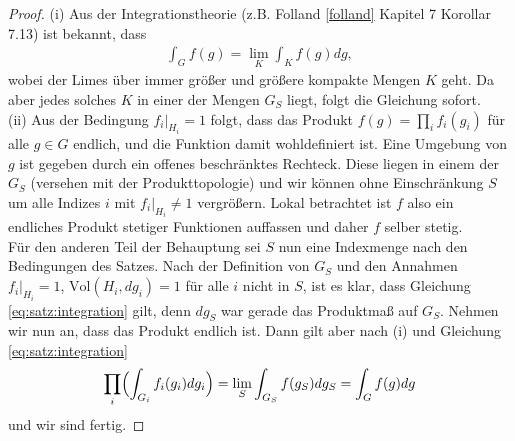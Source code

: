 		\begin{proof}
			(i) Aus der Integrationstheorie (z.B. Folland \ref{folland} Kapitel 7 Korollar 7.13) ist bekannt, dass %
			\begin{align*}
				\int_{G} f(g) = \lim_{K} \int_{K} f(g)dg,
			\end{align*}
			wobei der Limes über immer größer und größere kompakte Mengen  $K$ geht. Da aber jedes solches $K$ in einer der Mengen $G_S$ liegt, folgt die Gleichung sofort.\\
			
			\noindent(ii) Aus der Bedingung $f_i |_{H_i} = 1$ folgt, dass das Produkt $f(g) = \prod_{i}f_{i}(g_i)$ für alle $g \in G$ endlich, und die Funktion damit wohldefiniert ist. Eine Umgebung von $g$ ist gegeben durch ein offenes beschränktes Rechteck. Diese liegen in einem der $G_S$ (versehen mit der Produkttopologie) und wir können ohne Einschränkung $S$ um alle Indizes $i$ mit $f_i|_{H_i}\not= 1$ vergrößern.
			Lokal betrachtet ist $f$ also ein endliches Produkt stetiger Funktionen auffassen und daher $f$ selber stetig.\\
			Für den anderen Teil der Behauptung sei $S$ nun eine Indexmenge nach den Bedingungen des Satzes. 
			Nach der Definition von $G_S$ und den Annahmen $f_i|_{H_i} = 1$, $\text{Vol}(H_i, dg_i) = 1$ für alle $i$ nicht in $S$, ist es klar, dass Gleichung \ref{eq:satz:integration} gilt, denn $dg_S$ war gerade das Produktmaß auf $G_S$. Nehmen wir nun an, dass das Produkt endlich ist. 
			Dann gilt aber nach (i) und Gleichung \ref{eq:satz:integration}
			\begin{align*}
				\prod_{i}\Bigl(\int_{G_i} f_i (g_i)dg_i\Bigr) = \lim_S \int_{G_S} f(g_S) dg_S = \int_{G} f(g) dg
			\end{align*}
			und wir sind fertig.
		\end{proof}

